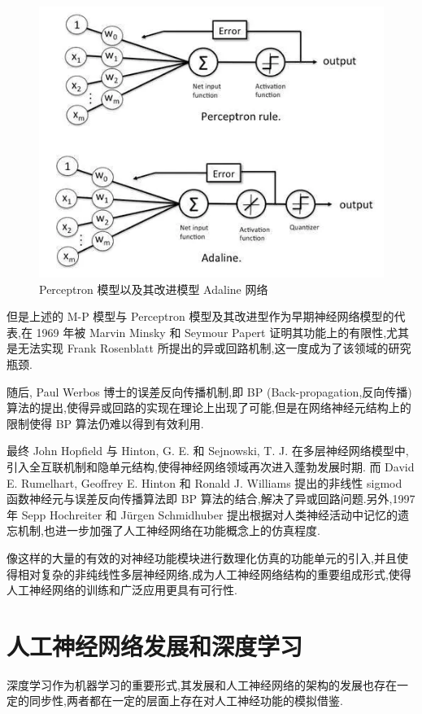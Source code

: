 \begin{figure}[H]
	\centering
	\includegraphics[scale=0.7]{Figures/perceptron.png}
	\caption{Perceptron 模型以及其改进模型 Adaline 网络}
\end{figure}

但是上述的 M-P 模型与 Perceptron 模型及其改进型作为早期神经网络模型的代表,在 1969 年被 Marvin Minsky 和 Seymour Papert 证明其功能上的有限性,尤其是无法实现 Frank Rosenblatt 所提出的异或回路机制,这一度成为了该领域的研究瓶颈. 

随后, Paul Werbos 博士的误差反向传播机制,即 BP (Back-propagation,反向传播) 算法的提出,使得异或回路的实现在理论上出现了可能,但是在网络神经元结构上的限制使得 BP 算法仍难以得到有效利用.

最终 John Hopfield 与 Hinton, G. E. 和 Sejnowski, T. J. 在多层神经网络模型中,引入全互联机制和隐单元结构,使得神经网络领域再次进入蓬勃发展时期. 而 David E. Rumelhart, Geoffrey E. Hinton 和 Ronald J. Williams 提出的非线性 sigmod 函数神经元与误差反向传播算法即 BP 算法的结合,解决了异或回路问题.另外,1997年 Sepp Hochreiter 和 Jürgen Schmidhuber 提出根据对人类神经活动中记忆的遗忘机制,也进一步加强了人工神经网络在功能概念上的仿真程度.

像这样的大量的有效的对神经功能模块进行数理化仿真的功能单元的引入,并且使得相对复杂的非纯线性多层神经网络,成为人工神经网络结构的重要组成形式,使得人工神经网络的训练和广泛应用更具有可行性.

\section{人工神经网络发展和深度学习}
深度学习作为机器学习的重要形式,其发展和人工神经网络的架构的发展也存在一定的同步性,两者都在一定的层面上存在对人工神经功能的模拟借鉴.

